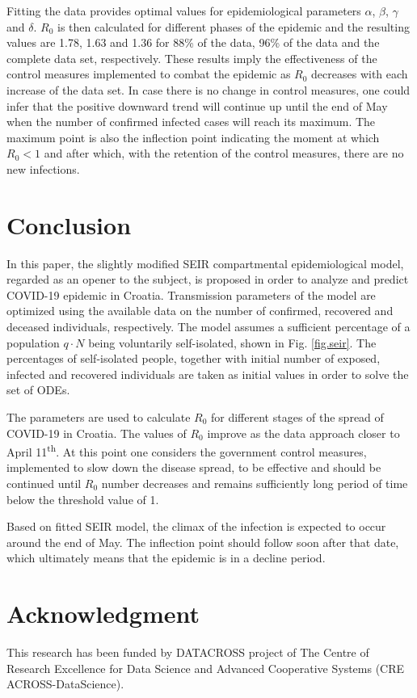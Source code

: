 \documentclass[conference]{IEEEtran}
\begin{document}
Fitting the data provides optimal values for epidemiological parameters $\alpha$, $\beta$, $\gamma$ and $\delta$. $R_0$ is then calculated for different phases of the epidemic and the resulting values are 1.78, 1.63 and 1.36 for 88\% of the data, 96\% of the data and the complete data set, respectively. 
These results imply the effectiveness of the control measures implemented to combat the epidemic as $R_0$ decreases with each increase of the data set. In case there is no change in control measures, one could infer that the positive downward trend will continue up until the end of May when the number of confirmed infected cases will reach its maximum. The maximum point is also the inflection point indicating the moment at which $R_0<1$ and after which, with the retention of the control measures, there are no new infections.

\section{Conclusion}
\label{sec.conclusion}
In this paper, the slightly modified SEIR compartmental epidemiological model, regarded as an opener to the subject, is proposed in order to analyze and predict COVID-19 epidemic in Croatia. Transmission parameters of the model are optimized using the available data on the number of confirmed, recovered and deceased individuals, respectively. The model assumes a sufficient percentage of a population $q \cdot N$ being voluntarily self-isolated, shown in Fig. \ref{fig.seir}. The percentages of self-isolated people, together with initial number of exposed, infected and recovered individuals are taken as initial values in order to solve the set of ODEs.

The parameters are used to calculate $R_0$ for different stages of the spread of COVID-19 in Croatia. The values of $R_0$ improve as the data approach closer to April 11\textsuperscript{th}. At this point one considers the government control measures, implemented to slow down the disease spread, to be effective and should be continued until $R_0$ number decreases and remains sufficiently long period of time below the threshold value of 1.

Based on fitted SEIR model, the climax of the infection is expected to occur around the end of May. The inflection point should follow soon after that date, which ultimately means that the epidemic is in a decline period.

\section*{Acknowledgment}
This research has been funded by DATACROSS project of The Centre of Research Excellence for Data Science and Advanced Cooperative Systems (CRE ACROSS-DataScience).
\end{document}
